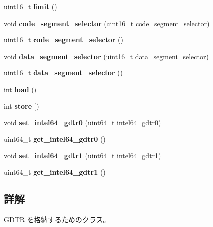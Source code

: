\begin{DoxyCompactItemize}
uint16\+\_\+t {\bfseries limit} ()
\item 
\hypertarget{classintel64__gdtr_a0552ea7940cf37442ec75268f65b27e8}{}\label{classintel64__gdtr_a0552ea7940cf37442ec75268f65b27e8} 
void {\bfseries code\+\_\+segment\+\_\+selector} (uint16\+\_\+t code\+\_\+segment\+\_\+selector)
\item 
\hypertarget{classintel64__gdtr_a15c039357bb4a520e4537e5e1708ece3}{}\label{classintel64__gdtr_a15c039357bb4a520e4537e5e1708ece3} 
uint16\+\_\+t {\bfseries code\+\_\+segment\+\_\+selector} ()
\item 
\hypertarget{classintel64__gdtr_aee02575c697df7ed75a1b3e43686ff47}{}\label{classintel64__gdtr_aee02575c697df7ed75a1b3e43686ff47} 
void {\bfseries data\+\_\+segment\+\_\+selector} (uint16\+\_\+t data\+\_\+segment\+\_\+selector)
\item 
\hypertarget{classintel64__gdtr_a683fdd1a65594ee6a5f65ce4a6be0af1}{}\label{classintel64__gdtr_a683fdd1a65594ee6a5f65ce4a6be0af1} 
uint16\+\_\+t {\bfseries data\+\_\+segment\+\_\+selector} ()
\item 
\hypertarget{classintel64__gdtr_aef2bfbfbf21ab2d918e85afcbe1dd618}{}\label{classintel64__gdtr_aef2bfbfbf21ab2d918e85afcbe1dd618} 
int {\bfseries load} ()
\item 
\hypertarget{classintel64__gdtr_ac6f7e3ce4569fac4b164816a8cbc9382}{}\label{classintel64__gdtr_ac6f7e3ce4569fac4b164816a8cbc9382} 
int {\bfseries store} ()
\item 
\hypertarget{classintel64__gdtr_a0931019cb582a6925999c406aacd0f35}{}\label{classintel64__gdtr_a0931019cb582a6925999c406aacd0f35} 
void {\bfseries set\+\_\+intel64\+\_\+gdtr0} (uint64\+\_\+t intel64\+\_\+gdtr0)
\item 
\hypertarget{classintel64__gdtr_a9b6055730cbc1a9560b08f4d12035b24}{}\label{classintel64__gdtr_a9b6055730cbc1a9560b08f4d12035b24} 
uint64\+\_\+t {\bfseries get\+\_\+intel64\+\_\+gdtr0} ()
\item 
\hypertarget{classintel64__gdtr_a90d550149c25007a4d55bd7d769783ee}{}\label{classintel64__gdtr_a90d550149c25007a4d55bd7d769783ee} 
void {\bfseries set\+\_\+intel64\+\_\+gdtr1} (uint64\+\_\+t intel64\+\_\+gdtr1)
\item 
\hypertarget{classintel64__gdtr_a92c51dc778a145cda6353e3c905ca5e3}{}\label{classintel64__gdtr_a92c51dc778a145cda6353e3c905ca5e3} 
uint64\+\_\+t {\bfseries get\+\_\+intel64\+\_\+gdtr1} ()
\end{DoxyCompactItemize}


\subsection{詳解}
G\+D\+TR を格納するためのクラス。 

